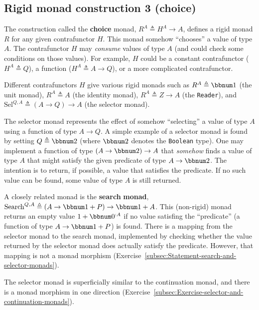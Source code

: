 \subsection{Rigid monad construction 3 (choice)\label{subsec:Rigid-monad-construction-1-choice}}

The construction called the \textbf{choice}
monad, $R^{A}\triangleq H^{A}\rightarrow A$, defines a rigid monad
$R$ for any given contrafunctor $H$. This monad somehow \textsf{``}chooses\textsf{''}
a value of type $A$. The contrafunctor $H$ may \emph{consume} values
of type $A$ (and could check some conditions on those values). For
example, $H$ could be a constant contrafunctor ($H^{A}\triangleq Q$),
a function ($H^{A}\triangleq A\rightarrow Q$), or a more complicated
contrafunctor.

Different contrafunctors $H$ give various rigid monads such as $R^{A}\triangleq\bbnum 1$
(the unit monad), $R^{A}\triangleq A$ (the identity monad), $R^{A}\triangleq Z\rightarrow A$
(the \lstinline!Reader!), and $\text{Sel}^{Q,A}\triangleq\left(A\rightarrow Q\right)\rightarrow A$
(the selector monad). 

The selector monad represents the effect of somehow \textsf{``}selecting\textsf{''}
a value of type $A$ using a function of type $A\rightarrow Q$. A
simple example of a selector monad is found by setting $Q\triangleq\bbnum 2$
(where $\bbnum 2$ denotes the \lstinline!Boolean! type). One may
implement a function of type $\left(A\rightarrow\bbnum 2\right)\rightarrow A$
that \emph{somehow} finds a value of type $A$ that might satisfy
the given predicate of type $A\rightarrow\bbnum 2$. The intention
is to return, if possible, a value that satisfies the predicate. If
no such value can be found, some value of type $A$ is still returned.

A closely related monad is the \textbf{search} \textbf{monad},
$\text{Search}^{Q,A}\triangleq\left(A\rightarrow\bbnum 1+P\right)\rightarrow\bbnum 1+A$.
This (non-rigid) monad returns an empty value $1+\bbnum 0^{:A}$ if
no value satisfing the \textsf{``}predicate\textsf{''} (a function of type $A\rightarrow\bbnum 1+P$)
is found. There is a mapping from the selector monad to the search
monad, implemented by checking whether the value returned by the selector
monad does actually satisfy the predicate. However, that mapping is
not a monad morphism (Exercise~\ref{subsec:Statement-search-and-selector-monads}).

The selector monad is superficially similar to the continuation monad,
and there is a monad morphism in one direction (Exercise~\ref{subsec:Exercise-selector-and-continuation-monads}).

